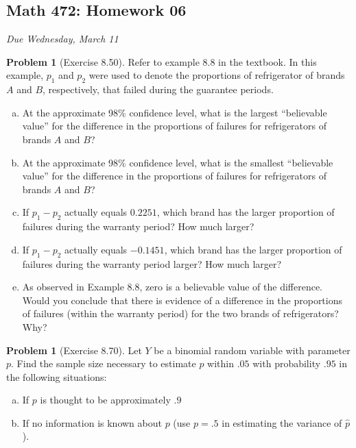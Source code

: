 \documentclass[10pt]{article}
\theoremstyle{definition}
\newtheorem{problem}[theorem]{Problem}
\newcommand{\1}[1]{\textbf{1}_{\left[#1\right]}} %
\begin{document}
\begin{center}
  \section*{Math 472: Homework 06}
  \textit{Due Wednesday, March 11}
\end{center}


\begin{problem}[Exercise 8.50]
  Refer to example 8.8 in the textbook. In this example, $p_{1}$ and $p_{2}$
  were used to denote the proportions of refrigerator of brands $A$ and $B$,
  respectively, that failed during the guarantee periods.
  \begin{enumerate}[(a)]
    \item At the approximate 98\% confidence level, what is the largest
    ``believable value'' for the difference in the proportions of failures for
    refrigerators of brands $A$ and $B$?
    \item At the approximate 98\% conﬁdence level, what is the smallest
    ``believable value'' for the difference in the proportions of failures for
    refrigerators of brands $A$ and $B$? 
    \item If $p_1-p_2$ actually equals $0.2251$, which brand has the larger
    proportion of failures during the warranty period? How much larger?
    \item If $p_1-p_2$ actually equals $-0.1451$, which brand has the larger
    proportion of failures during the warranty period larger? How much larger?
    \item As observed in Example 8.8, zero is a believable value of the
    difference. Would you conclude that there is evidence of a difference in the
    proportions of failures (within the warranty period) for the two brands of
    refrigerators? Why?
  \end{enumerate}
\end{problem}


\begin{problem}[Exercise 8.70]
  Let $Y$ be a binomial random variable with parameter $p$. Find the sample
  size necessary to estimate $p$ within $.05$ with probability $.95$ in the
  following situations:
  \begin{enumerate}[(a)]
    \item If $p$ is thought to be approximately $.9$
    \item If no information is known about $p$ (use $p=.5$ in estimating the
    variance of $\widehat{p}$).
  \end{enumerate}
\end{problem}
\end{document}
